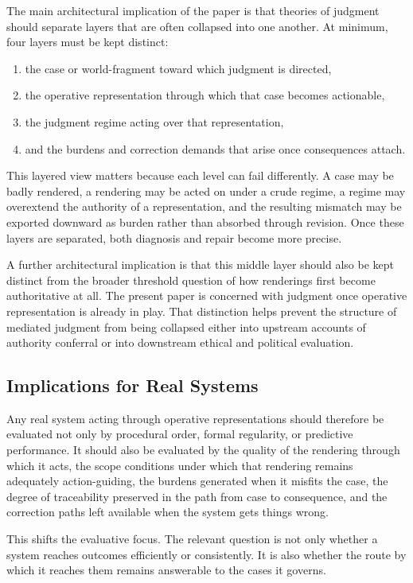 \documentclass[11pt]{article}
\begin{document}
The main architectural implication of the paper is that theories of judgment should separate layers that are often collapsed into one another. At minimum, four layers must be kept distinct:
\begin{enumerate}
    \item the case or world-fragment toward which judgment is directed,
    \item the operative representation through which that case becomes actionable,
    \item the judgment regime acting over that representation,
    \item and the burdens and correction demands that arise once consequences attach.
\end{enumerate}

This layered view matters because each level can fail differently. A case may be badly rendered, a rendering may be acted on under a crude regime, a regime may overextend the authority of a representation, and the resulting mismatch may be exported downward as burden rather than absorbed through revision. Once these layers are separated, both diagnosis and repair become more precise.

A further architectural implication is that this middle layer should also be kept distinct from the broader threshold question of how renderings first become authoritative at all. The present paper is concerned with judgment once operative representation is already in play. That distinction helps prevent the structure of mediated judgment from being collapsed either into upstream accounts of authority conferral or into downstream ethical and political evaluation.

\subsection{Implications for Real Systems}

Any real system acting through operative representations should therefore be evaluated not only by procedural order, formal regularity, or predictive performance. It should also be evaluated by the quality of the rendering through which it acts, the scope conditions under which that rendering remains adequately action-guiding, the burdens generated when it misfits the case, the degree of traceability preserved in the path from case to consequence, and the correction paths left available when the system gets things wrong.

This shifts the evaluative focus. The relevant question is not only whether a system reaches outcomes efficiently or consistently. It is also whether the route by which it reaches them remains answerable to the cases it governs.
\end{document}

